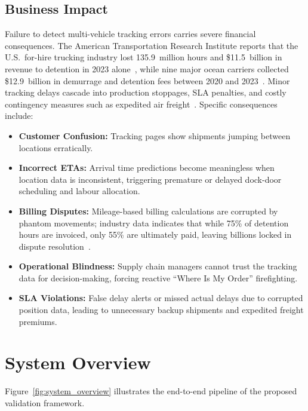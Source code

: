 \subsection{Business Impact}
Failure to detect multi-vehicle tracking errors carries severe financial consequences. The American Transportation Research Institute reports that the U.S.\ for-hire trucking industry lost 135.9~million hours and \$11.5~billion in revenue to detention in 2023 alone~\cite{atri2024detention}, while nine major ocean carriers collected \$12.9~billion in demurrage and detention fees between 2020 and 2023~\cite{descartes2024demurrage}. Minor tracking delays cascade into production stoppages, SLA penalties, and costly contingency measures such as expedited air freight~\cite{intermodal2024delay}. Specific consequences include:
\begin{itemize}
    \item \textbf{Customer Confusion:} Tracking pages show shipments jumping between locations erratically.
    \item \textbf{Incorrect ETAs:} Arrival time predictions become meaningless when location data is inconsistent, triggering premature or delayed dock-door scheduling and labour allocation.
    \item \textbf{Billing Disputes:} Mileage-based billing calculations are corrupted by phantom movements; industry data indicates that while 75\% of detention hours are invoiced, only 55\% are ultimately paid, leaving billions locked in dispute resolution~\cite{atri2024detention}.
    \item \textbf{Operational Blindness:} Supply chain managers cannot trust the tracking data for decision-making, forcing reactive ``Where Is My Order'' firefighting.
    \item \textbf{SLA Violations:} False delay alerts or missed actual delays due to corrupted position data, leading to unnecessary backup shipments and expedited freight premiums.
\end{itemize}

\clearpage
\section{System Overview}

Figure~\ref{fig:system_overview} illustrates the end-to-end pipeline of the proposed validation framework.

